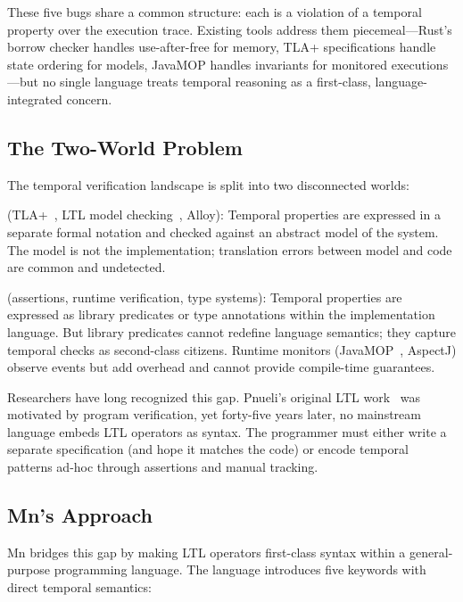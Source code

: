 \documentclass[11pt,a4paper]{article}
\begin{document}
These five bugs share a common structure: each is a violation of a temporal property over the
execution trace. Existing tools address them piecemeal---Rust's borrow checker handles
use-after-free for memory, TLA+ specifications handle state ordering for models, JavaMOP
handles invariants for monitored executions---but no single language treats temporal reasoning
as a first-class, language-integrated concern.

\subsection{The Two-World Problem}

The temporal verification landscape is split into two disconnected worlds:

\begin{description}[leftmargin=2em,itemsep=3pt]
  \item[The specification world] (TLA+~\cite{lamport2002}, LTL model
    checking~\cite{pnueli1977}, Alloy): Temporal properties are expressed in a separate formal
    notation and checked against an abstract model of the system. The model is not the
    implementation; translation errors between model and code are common and undetected.

  \item[The implementation world] (assertions, runtime verification, type systems): Temporal
    properties are expressed as library predicates or type annotations within the
    implementation language. But library predicates cannot redefine language semantics; they
    capture temporal checks as second-class citizens. Runtime monitors (JavaMOP~\cite{meredith2012},
    AspectJ) observe events but add overhead and cannot provide compile-time guarantees.
\end{description}

Researchers have long recognized this gap. Pnueli's original LTL work~\cite{pnueli1977} was
motivated by program verification, yet forty-five years later, no mainstream language embeds
LTL operators as syntax. The programmer must either write a separate specification (and hope
it matches the code) or encode temporal patterns ad-hoc through assertions and manual tracking.

\subsection{Mn's Approach}

Mn bridges this gap by making LTL operators first-class syntax within a general-purpose
programming language. The language introduces five keywords with direct temporal semantics:
\end{document}
